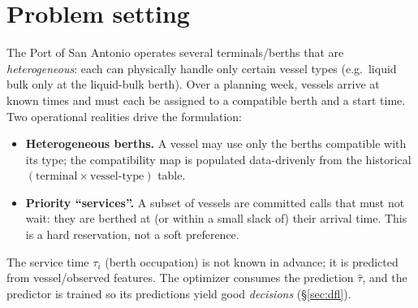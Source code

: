 \documentclass[11pt]{article}
\begin{document}
\section{Problem setting}
The Port of San Antonio operates several terminals/berths that are
\emph{heterogeneous}: each can physically handle only certain vessel types
(e.g.\ liquid bulk only at the liquid-bulk berth). Over a planning week, vessels
arrive at known times and must each be assigned to a compatible berth and a
start time. Two operational realities drive the formulation:
\begin{itemize}[nosep]
  \item \textbf{Heterogeneous berths.} A vessel may use only the berths
  compatible with its type; the compatibility map is populated data-drivenly
  from the historical $(\text{terminal}\times\text{vessel-type})$ table.
  \item \textbf{Priority ``services''.} A subset of vessels are committed calls
  that must not wait: they are berthed at (or within a small slack of) their
  arrival time. This is a hard reservation, not a soft preference.
\end{itemize}
The service time $\tau_i$ (berth occupation) is not known in advance; it is
predicted from vessel/observed features. The optimizer consumes the prediction
$\hat\tau$, and the predictor is trained so its predictions yield good
\emph{decisions} (\S\ref{sec:dfl}).
\end{document}

